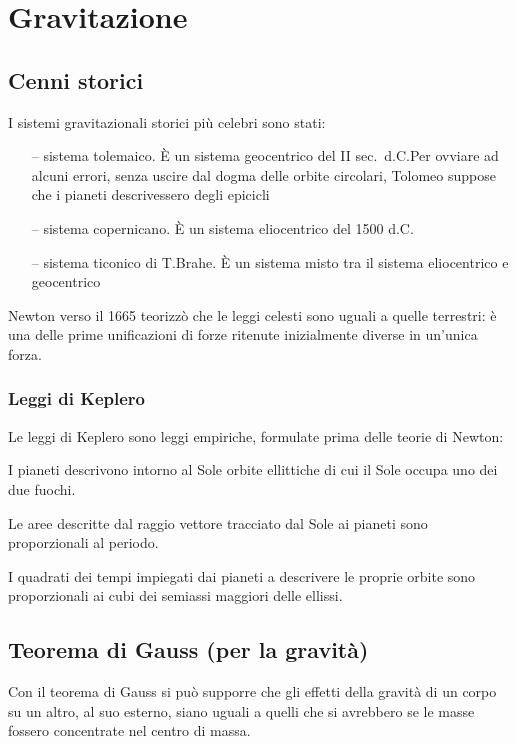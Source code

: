 \chapter{Gravitazione}
\section{Cenni storici}
I sistemi gravitazionali storici più celebri sono stati:
\begin{itemize}
\item[--]sistema tolemaico. \`E un sistema geocentrico del II
sec.\ d.C.\@ Per ovviare ad alcuni errori, senza uscire dal dogma
delle orbite circolari, Tolomeo suppose che i pianeti
descrivessero degli epicicli
\item[--]sistema copernicano. \`E un sistema eliocentrico del 1500
d.C.
\item[--]sistema ticonico di T.Brahe. \`E un sistema misto tra il sistema
eliocentrico e geocentrico
\end{itemize}

Newton verso il 1665 teorizzò che le leggi celesti sono uguali a quelle terrestri: è una delle prime unificazioni di forze ritenute inizialmente diverse in un'unica forza.

\subsection{Leggi di Keplero}
Le leggi di Keplero sono leggi empiriche, formulate prima delle
teorie di Newton:
\begin{legge}
I pianeti descrivono intorno al Sole orbite ellittiche di cui il Sole occupa uno dei due fuochi. \end{legge}
\begin{legge}
 Le aree descritte dal raggio vettore tracciato dal Sole ai pianeti sono proporzionali al periodo.
\end{legge}
\begin{legge}
I quadrati dei tempi impiegati dai pianeti a descrivere le proprie orbite sono proporzionali ai cubi dei semiassi maggiori delle ellissi.
\end{legge}


\section{Teorema di Gauss (per la gravità)}
Con il teorema di Gauss si può supporre che gli effetti della
gravità di un corpo su un altro, al suo esterno, siano uguali a
quelli che si avrebbero se le masse fossero concentrate nel centro
di massa.



